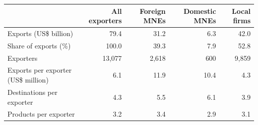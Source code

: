 \begin{tabular}{lrrrr}
\toprule
 & All exporters & Foreign MNEs & Domestic MNEs & Local firms \\
\midrule
Exports (US\$ billion) & 79.4 & 31.2 & 6.3 & 42.0 \\
Share of exports (\%) & 100.0 & 39.3 & 7.9 & 52.8 \\
Exporters & 13,077 & 2,618 & 600 & 9,859 \\
Exports per exporter (US\$ million) & 6.1 & 11.9 & 10.4 & 4.3 \\
Destinations per exporter & 4.3 & 5.5 & 6.1 & 3.9 \\
Products per exporter & 3.2 & 3.4 & 2.9 & 3.1 \\
\bottomrule
\end{tabular}
